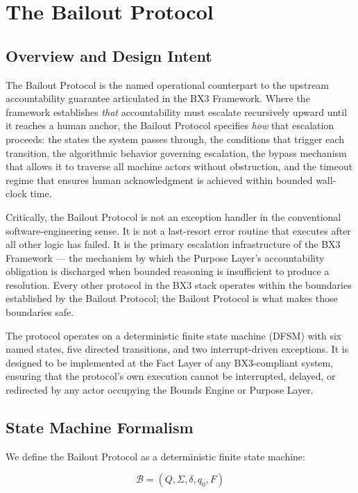 \section{The Bailout Protocol}
\label{sec:bailout}

\subsection{Overview and Design Intent}

The Bailout Protocol is the named operational counterpart to the upstream accountability guarantee articulated in the BX3 Framework. Where the framework establishes \textit{that} accountability must escalate recursively upward until it reaches a human anchor, the Bailout Protocol specifies \textit{how} that escalation proceeds: the states the system passes through, the conditions that trigger each transition, the algorithmic behavior governing escalation, the bypass mechanism that allows it to traverse all machine actors without obstruction, and the timeout regime that ensures human acknowledgment is achieved within bounded wall-clock time.

Critically, the Bailout Protocol is not an exception handler in the conventional software-engineering sense. It is not a last-resort error routine that executes after all other logic has failed. It is the primary escalation infrastructure of the BX3 Framework --- the mechanism by which the Purpose Layer's accountability obligation is discharged when bounded reasoning is insufficient to produce a resolution. Every other protocol in the BX3 stack operates within the boundaries established by the Bailout Protocol; the Bailout Protocol is what makes those boundaries safe.

The protocol operates on a deterministic finite state machine (DFSM) with six named states, five directed transitions, and two interrupt-driven exceptions. It is designed to be implemented at the Fact Layer of any BX3-compliant system, ensuring that the protocol's own execution cannot be interrupted, delayed, or redirected by any actor occupying the Bounds Engine or Purpose Layer.

\subsection{State Machine Formalism}

We define the Bailout Protocol as a deterministic finite state machine:

\[
\mathcal{B} = (Q, \Sigma, \delta, q_0, F)
\]

